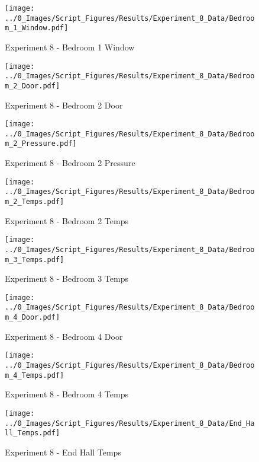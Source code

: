 	\clearpage

	\begin{figure}[H]
		\centering
		\texttt{[image: ../0\_Images/Script\_Figures/Results/Experiment\_8\_Data/Bedroom\_1\_Window.pdf]}
		\caption[]{Experiment 8 - Bedroom 1 Window}
	\end{figure}
 

	\begin{figure}[H]
		\centering
		\texttt{[image: ../0\_Images/Script\_Figures/Results/Experiment\_8\_Data/Bedroom\_2\_Door.pdf]}
		\caption[]{Experiment 8 - Bedroom 2 Door}
	\end{figure}
 
	\clearpage

	\begin{figure}[H]
		\centering
		\texttt{[image: ../0\_Images/Script\_Figures/Results/Experiment\_8\_Data/Bedroom\_2\_Pressure.pdf]}
		\caption[]{Experiment 8 - Bedroom 2 Pressure}
	\end{figure}
 

	\begin{figure}[H]
		\centering
		\texttt{[image: ../0\_Images/Script\_Figures/Results/Experiment\_8\_Data/Bedroom\_2\_Temps.pdf]}
		\caption[]{Experiment 8 - Bedroom 2 Temps}
	\end{figure}
 
	\clearpage

	\begin{figure}[H]
		\centering
		\texttt{[image: ../0\_Images/Script\_Figures/Results/Experiment\_8\_Data/Bedroom\_3\_Temps.pdf]}
		\caption[]{Experiment 8 - Bedroom 3 Temps}
	\end{figure}
 

	\begin{figure}[H]
		\centering
		\texttt{[image: ../0\_Images/Script\_Figures/Results/Experiment\_8\_Data/Bedroom\_4\_Door.pdf]}
		\caption[]{Experiment 8 - Bedroom 4 Door}
	\end{figure}
 
	\clearpage

	\begin{figure}[H]
		\centering
		\texttt{[image: ../0\_Images/Script\_Figures/Results/Experiment\_8\_Data/Bedroom\_4\_Temps.pdf]}
		\caption[]{Experiment 8 - Bedroom 4 Temps}
	\end{figure}
 

	\begin{figure}[H]
		\centering
		\texttt{[image: ../0\_Images/Script\_Figures/Results/Experiment\_8\_Data/End\_Hall\_Temps.pdf]}
		\caption[]{Experiment 8 - End Hall Temps}
	\end{figure}
 
